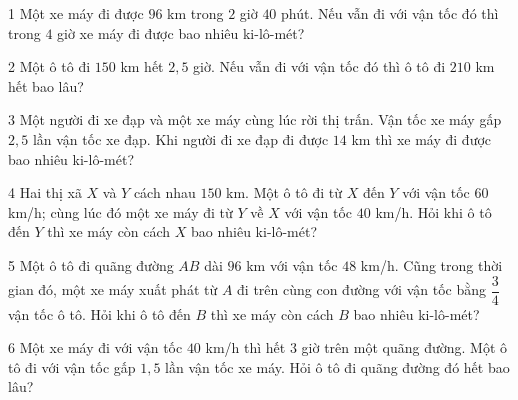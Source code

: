 \begin{probbox}{1}{\relax}
Một xe máy đi được $96$ km trong $2$ giờ $40$ phút. Nếu vẫn đi với vận tốc đó thì trong $4$ giờ xe máy đi được bao nhiêu ki-lô-mét?
\end{probbox}
\gap
\begin{probbox}{2}{\relax}
Một ô tô đi $150$ km hết $2{,}5$ giờ. Nếu vẫn đi với vận tốc đó thì ô tô đi $210$ km hết bao lâu?
\end{probbox}
\gap
\begin{probbox}{3}{\relax}
Một người đi xe đạp và một xe máy cùng lúc rời thị trấn. Vận tốc xe máy gấp $2{,}5$ lần vận tốc xe đạp. Khi người đi xe đạp đi được $14$ km thì xe máy đi được bao nhiêu ki-lô-mét?
\end{probbox}
\gap
\begin{probbox}{4}{\relax}
Hai thị xã $X$ và $Y$ cách nhau $150$ km. Một ô tô đi từ $X$ đến $Y$ với vận tốc $60$ km/h; cùng lúc đó một xe máy đi từ $Y$ về $X$ với vận tốc $40$ km/h. Hỏi khi ô tô đến $Y$ thì xe máy còn cách $X$ bao nhiêu ki-lô-mét?
\end{probbox}
\gap
\begin{probbox}{5}{\relax}
Một ô tô đi quãng đường $AB$ dài $96$ km với vận tốc $48$ km/h. Cũng trong thời gian đó, một xe máy xuất phát từ $A$ đi trên cùng con đường với vận tốc bằng $\dfrac34$ vận tốc ô tô. Hỏi khi ô tô đến $B$ thì xe máy còn cách $B$ bao nhiêu ki-lô-mét?
\end{probbox}
\gap
\begin{probbox}{6}{\relax}
Một xe máy đi với vận tốc $40$ km/h thì hết $3$ giờ trên một quãng đường. Một ô tô đi với vận tốc gấp $1{,}5$ lần vận tốc xe máy. Hỏi ô tô đi quãng đường đó hết bao lâu?
\end{probbox}

